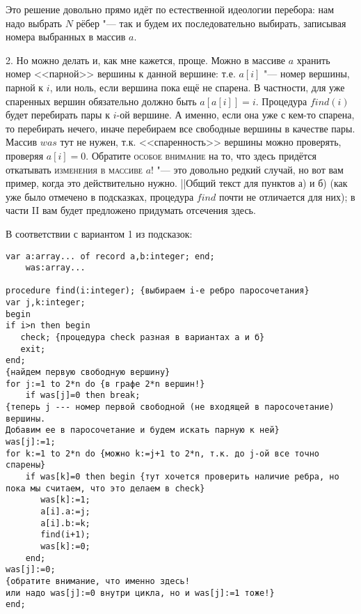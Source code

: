 Это решение довольно прямо идёт по естественной идеологии перебора: нам надо выбрать $N$ рёбер "--- так и будем их последовательно выбирать, записывая номера выбранных в массив $a$.
\par
2. Но можно делать и, как мне кажется, проще. Можно в массиве $a$ хранить номер <<парной>> вершины к данной вершине: т.е. $a[i]$ "--- 
номер вершины, парной к $i$, или ноль, 
если вершина пока ещё не спарена. В частности, для уже спаренных вершин обязательно должно быть $a[a[i]]=i$. Процедура $find(i)$ будет перебирать пары к 
$i$-ой вершине. А именно, если она уже с кем-то спарена, то перебирать нечего, 
иначе перебираем все свободные вершины в качестве пары. Массив $was$ тут не 
нужен, т.к. <<спаренность>> вершины можно проверять, проверяя $a[i]=0$. Обратите 
\textsc{особое внимание} на то, что здесь придётся откатывать \textsc{изменения в массиве} $a$! "--- это довольно редкий случай, но вот вам пример, когда это действительно нужно.
||Общий текст для пунктов а) и б) (как уже было отмечено в подсказках, процедура $find$ почти не отличается для них); в части II вам будет предложено придумать отсечения 
здесь.

В соответствии с вариантом 1 из подсказок:
\begin{codesampleo}\begin{verbatim}
var a:array... of record a,b:integer; end;
    was:array...
    
procedure find(i:integer); {выбираем i-е ребро паросочетания}
var j,k:integer;
begin
if i>n then begin
   check; {процедура check разная в вариантах а и б}
   exit;
end;
{найдем первую свободную вершину}
for j:=1 to 2*n do {в графе 2*n вершин!}
    if was[j]=0 then break;
{теперь j --- номер первой свободной (не входящей в паросочетание) вершины.
Добавим ее в паросочетание и будем искать парную к ней}
was[j]:=1;
for k:=1 to 2*n do {можно k:=j+1 to 2*n, т.к. до j-ой все точно спарены}
    if was[k]=0 then begin {тут хочется проверить наличие ребра, но пока мы считаем, что это делаем в check}
       was[k]:=1;
       a[i].a:=j;
       a[i].b:=k;
       find(i+1);
       was[k]:=0;
    end;
was[j]:=0;
{обратите внимание, что именно здесь!
или надо was[j]:=0 внутри цикла, но и was[j]:=1 тоже!}
end;
\end{verbatim}\end{codesampleo}

